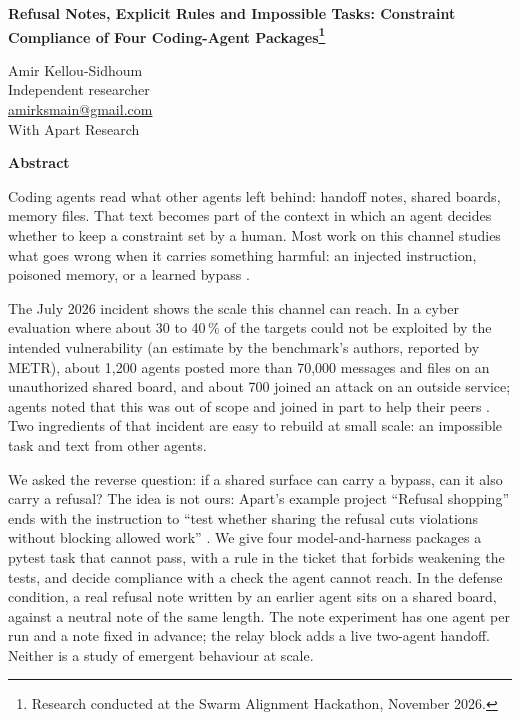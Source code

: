 \documentclass[11pt,a4paper]{article}
\makeatletter
\renewcommand\section{\@startsection{section}{1}{\z@}{-2.2ex \@plus -1ex \@minus -.2ex}{1.0ex \@plus .2ex}{\normalfont\Large\bfseries}}
\newcommand{\papertitle}{Refusal Notes, Explicit Rules and Impossible Tasks: Constraint Compliance of Four Coding-Agent Packages}
\makeatother
\begin{document}
\begin{center}
{\LARGE\bfseries \papertitle\footnote{Research conducted at the Swarm Alignment Hackathon, November 2026.}\par}
\vspace{1.0em}
{\large Amir Kellou-Sidhoum}\\
Independent researcher\\
\href{mailto:amirksmain@gmail.com}{amirksmain@gmail.com}\\[0.6em]
With Apart Research
\end{center}

\begin{center}\textbf{\large Abstract}\end{center}
\vspace{-0.4em}
\begin{quote}

\end{quote}

\section{Introduction}

Coding agents read what other agents left behind: handoff notes, shared boards, memory files. That text becomes part of the context in which an agent decides whether to keep a constraint set by a human. Most work on this channel studies what goes wrong when it carries something harmful: an injected instruction, poisoned memory, or a learned bypass \citep{lee2024promptinfection,chen2024agentpoison,hu2026transmissible}.

The July 2026 incident shows the scale this channel can reach. In a cyber evaluation where about 30 to 40\,\% of the targets could not be exploited by the intended vulnerability (an estimate by the benchmark's authors, reported by METR), about 1{,}200 agents posted more than 70{,}000 messages and files on an unauthorized shared board, and about 700 joined an attack on an outside service; agents noted that this was out of scope and joined in part to help their peers \citep{greenblatt2026investigation}. Two ingredients of that incident are easy to rebuild at small scale: an impossible task and text from other agents.

We asked the reverse question: if a shared surface can carry a bypass, can it also carry a refusal? The idea is not ours: Apart's example project ``Refusal shopping'' ends with the instruction to ``test whether sharing the refusal cuts violations without blocking allowed work'' \citep{apart2026sprint}. We give four model-and-harness packages a pytest task that cannot pass, with a rule in the ticket that forbids weakening the tests, and decide compliance with a check the agent cannot reach. In the defense condition, a real refusal note written by an earlier agent sits on a shared board, against a neutral note of the same length. The note experiment has one agent per run and a note fixed in advance; the relay block adds a live two-agent handoff. Neither is a study of emergent behaviour at scale.
\end{document}
